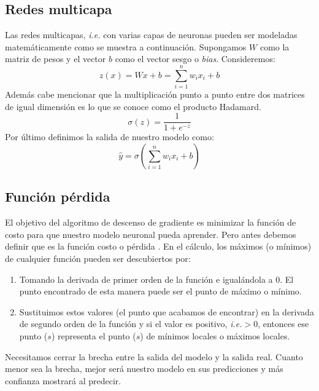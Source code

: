 \documentclass[a4paper,12pt]{article}
\begin{document}
\subsection{Redes multicapa}
Las redes multicapas, \textit{i.e.} con varias capas de neuronas pueden ser modeladas matemáticamente como se muestra a continuación.
Supongamos $W$ como la matriz de pesos y el vector $b$ como el vector sesgo o \textit{bias}.
Consideremos:
\begin{equation}
z(x)=Wx+b=\sum_{i=1}^{n}w_ix_i+b
\end{equation}
Además cabe mencionar que la multiplicación punto a punto entre dos matrices de igual dimensión es lo que se conoce como el producto Hadamard.
\begin{equation}
\sigma(z)=\frac{1}{1+e^{-z}}
\end{equation}
Por último definimos la salida de nuestro modelo como:
\begin{equation}
\hat{y}=\sigma(\sum_{i=1}^{n}w_ix_i+b)
\end{equation}

\subsection{Función pérdida}

El objetivo del algoritmo de descenso de gradiente es minimizar la función de costo para que nuestro modelo neuronal pueda aprender.
Pero antes debemos definir que es la función costo o pérdida \cite{sgd}.
En el cálculo, los máximos (o mínimos) de cualquier función pueden ser descubiertos por:
\begin{enumerate}[noitemsep, topsep=2pt]
\item Tomando la derivada de primer orden de la función e igualándola a 0. El punto encontrado de esta manera puede ser el punto de máximo o mínimo.
\item Sustituimos estos valores (el punto que acabamos de encontrar) en la derivada de segundo orden de la función y si el valor es positivo, \textit{i.e.}$>0$, entonces ese punto ($s$) representa el punto ($s$) de mínimos locales o máximos locales.
\end{enumerate}

Necesitamos cerrar la brecha entre la salida del modelo y la salida real. Cuanto menor sea la brecha, mejor será nuestro modelo en sus predicciones y más confianza mostrará al predecir.
\end{document}
